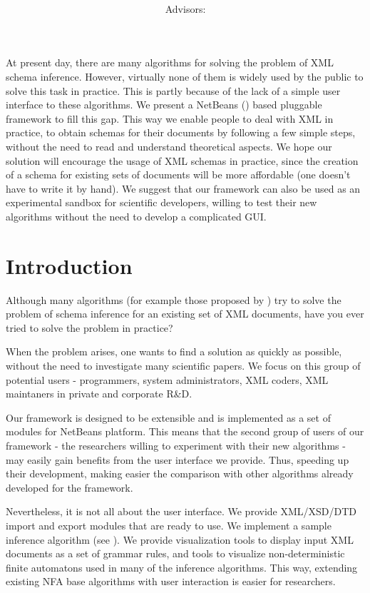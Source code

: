 \documentclass[a4paper,8pt,oneside,twocolumn]{article}
\title{\bf\mftitle}
\author{\mfauthor \\ Advisors: \mfadvisor}
\date{\mfplacedate}
\begin{document}
\maketitle

\abstract
At present day, there are many algorithms for solving the problem of XML schema inference.
However, virtually none of them is widely used by the public to solve this task in practice.
This is partly because of the lack of a simple user interface to these algorithms.
We present a NetBeans (\cite{netbeans}) based pluggable framework to fill this gap.
This way we enable people to deal with XML in practice, to obtain schemas for their documents by following a few simple steps, without the need to read and understand theoretical aspects.
We hope our solution will encourage the usage of XML schemas in practice, since the creation of a schema for existing sets of documents will be more affordable (one doesn't have to write it by hand).
We suggest that our framework can also be used as an experimental sandbox for scientific developers, willing to test their new algorithms without the need to develop a complicated GUI.

\section*{Introduction}
Although many algorithms (for example those proposed by \cite{ahonen, Bex:2006:ICD:1182635.1164139, Bex:2007:IXS:1325851.1325964, 1802522, vyhnanovska}) try to solve the problem of schema inference for an existing set of XML documents, have you ever tried to solve the problem in practice?

When the problem arises, one wants to find a solution as quickly as possible, without the need to investigate many scientific papers.
We focus on this group of potential users - programmers, system administrators, XML coders, XML maintaners in private and corporate R\&D.

Our framework is designed to be extensible and is implemented as a set of modules for NetBeans platform.
This means that the second group of users of our framework - the researchers willing to experiment with their new algorithms - may easily gain benefits from the user interface we provide. Thus, speeding up their development,  making easier the comparison with other algorithms already developed for the framework.

Nevertheless, it is not all about the user interface.
We provide XML/XSD/DTD import and export modules that are ready to use.
We implement a sample inference algorithm (see \cite{ahonen}).
We provide visualization tools to display input XML documents as a set of grammar rules, and tools to visualize non-deterministic finite automatons used in many of the inference algorithms.
This way, extending existing NFA base algorithms with user interaction is easier for researchers.
\end{document}
